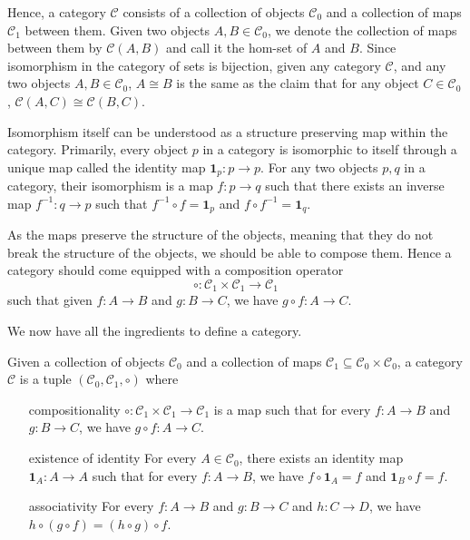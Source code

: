 Hence, a category $\mathcal{C}$ consists of a collection of objects $\mathcal{C}_0$
and a collection of maps $\mathcal{C}_1$ between them. Given two objects $A,B\in\mathcal{C}_0$,
we denote the collection of maps between them by $\mathcal{C}(A,B)$ and call it the hom-set of $A$ and $B$.
Since isomorphism in the category of sets is bijection, 
given any category $\mathcal{C}$, and any two objects $A,B\in\mathcal{C}_0$,
$A\cong B$ is the same as the claim that for any object $C\in\mathcal{C}_0$,
$\mathcal{C}(A,C)\cong \mathcal{C}(B,C)$.

Isomorphism itself can be understood as a structure preserving map within the category.
Primarily, every object $p$ in a category is isomorphic to itself through a unique
map called the identity map $\mathbf{1}_p:p\to p$.
For any two objects $p,q$ in a category, their isomorphism
is a map $f:p\to q$ such that there exists an inverse map $f^{-1}:q\to p$ such that
$f^{-1}\circ f=\mathbf{1}_p$ and $f\circ f^{-1}=\mathbf{1}_q$.

As the maps preserve the structure of the objects, meaning
that they do not break the structure of the objects,
we should be able to compose them.
Hence a category should come equipped with a composition
operator
\[
    \circ:\mathcal{C}_1\times\mathcal{C}_1\to\mathcal{C}_1
\]
such that given $f:A\to B$ and $g:B\to C$,
we have $g\circ f:A\to C$.

We now have all the ingredients to define a category.

\begin{definition}[Category]
    Given a collection of objects $\mathcal{C}_0$ and a collection of maps $\mathcal{C}_1\subseteq \mathcal{C}_0\times\mathcal{C}_0$,
    a category $\mathcal{C}$ is a tuple $(\mathcal{C}_0,\mathcal{C}_1,\circ)$ where
    \begin{itemize}
        \item[compositionality] $\circ:\mathcal{C}_1\times\mathcal{C}_1\to\mathcal{C}_1$ is a
        map such that for every $f:A\to B$ and $g:B\to C$, we have $g\circ f:A\to C$.
        \item[existence of identity] For every $A\in\mathcal{C}_0$, there exists an identity map $\mathbf{1}_A:A\to A$
        such that for every $f:A\to B$, we have $f\circ \mathbf{1}_A=f$ and $\mathbf{1}_B\circ f=f$.
        \item[associativity] For every $f:A\to B$ and $g:B\to C$ and $h:C\to D$, we have $h\circ (g\circ f)=(h\circ g)\circ f$.
    \end{itemize}
\end{definition}

